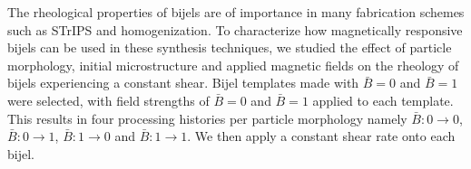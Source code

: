
The rheological properties of bijels are of importance in many fabrication schemes such as STrIPS and homogenization. \cite{haase_continuous_2015,cai_bijels_2017}
To characterize how magnetically responsive bijels can be used in these synthesis techniques, we studied the effect of particle morphology, initial microstructure and
applied magnetic fields on the rheology of bijels experiencing a constant shear. Bijel templates made with $\bar{B} = 0$ and $\bar{B} = 1$ were selected, with field strengths
of $\bar{B} = 0$ and $\bar{B} = 1$ applied to each template. This results in four processing histories per particle morphology namely $\bar{B}:0 \rightarrow 0$,
$\bar{B}:0 \rightarrow 1$, $\bar{B}:1 \rightarrow 0$ and $\bar{B}:1 \rightarrow 1$. We then apply a constant shear rate onto each bijel.

